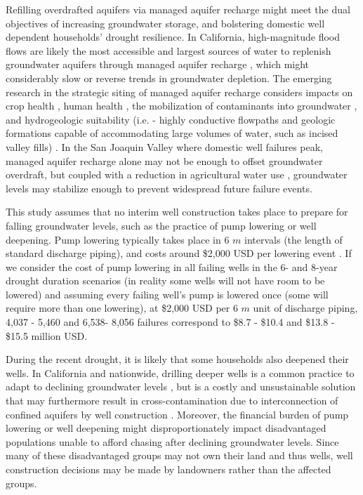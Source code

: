Refilling overdrafted aquifers via managed aquifer recharge might meet the dual objectives of increasing groundwater storage, and bolstering domestic well dependent households' drought resilience. In California, high-magnitude flood flows are likely the most accessible and largest sources of water to replenish groundwater aquifers through managed aquifer recharge \citep{Kocis2017}, which might considerably slow or reverse trends in groundwater depletion. The emerging research in the strategic siting of managed aquifer recharge considers impacts on crop health \citep{Dahlke2018}, human health \citep{ayuso2011quantifying}, the mobilization of contaminants into groundwater \citep{Xanke2017}, and hydrogeologic suitability (i.e. - highly conductive flowpaths and geologic formations capable of accommodating large volumes of water, such as incised valley fills) \citep{Maples2019}. In the San Joaquin Valley where domestic well failures peak, managed aquifer recharge alone may not be enough to offset groundwater overdraft, but coupled with a reduction in agricultural water use \citep{Hanak2019}, groundwater levels may stabilize enough to prevent widespread future failure events. 

This study assumes that no interim well construction takes place to prepare for falling groundwater levels, such as the practice of pump lowering or well deepening. Pump lowering typically takes place in 6 $m$ intervals (the length of standard discharge piping), and costs around \$2,000 USD per lowering event \citep{Gailey2019}. If we consider the cost of pump lowering in all failing wells in the 6- and 8-year drought duration scenarios (in reality some wells will not have room to be lowered) and assuming every failing well's pump is lowered once (some will require more than one lowering), at \$2,000 USD per 6 $m$ unit of discharge piping, 4,037 - 5,460 and 6,538- 8,056 failures correspond to \$8.7 - \$10.4 and \$13.8 - \$15.5 million USD. 

During the recent drought, it is likely that some households also deepened their wells. In California and nationwide, drilling deeper wells is a common practice to adapt to declining groundwater levels \citep{Perrone2019}, but is a costly and unsustainable solution that may furthermore result in cross-contamination due to interconnection of confined aquifers by well construction \citep{gailey2017inactive}. Moreover, the financial burden of pump lowering or well deepening might disproportionately impact disadvantaged populations \citep{Famiglietti2014} unable to afford chasing after declining groundwater levels. Since many of these disadvantaged groups may not own their land and thus wells, well construction decisions may be made by landowners rather than the affected groups.  

